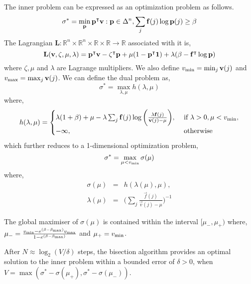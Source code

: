 The inner problem can be expressed as an optimization problem as follows.
\begin{equation}
\sigma^* = \min_{\mathbf{p}} \mathbf{\mathbf{p}}^\intercal\mathbf{v}: \mathbf{p} \in \Delta^n, \sum_{j} \mathbf{f}(j)\log{\ensuremath{\mathbf{p}}(j)} \geq \beta
\end{equation}
The Lagrangian $\mathbf{L}: \mathbb{R}^n \times \mathbb{R}^n \times \mathbb{R} \times \mathbb{R} \rightarrow \mathbb{R}$ associated with it is,
\begin{equation}
\mathbf{L}(\mathbf{v}, \zeta, \mu, \lambda) = \mathbf{\mathbf{p}}^\intercal\mathbf{v} - \mathbf{\zeta}^\intercal\mathbf{p} + \mu(1 - \mathbf{\mathbf{p}}^\intercal\mathbf{1}) + \lambda(\beta - \mathbf{f}^\intercal\log{\ensuremath{\mathbf{p}}})
\end{equation}
where $\zeta, \mu$ and $\lambda$ are Lagrange multipliers. We also define $v_{\textrm{min}} = \min_j{\mathbf{v}(j)}$ and $v_{\textrm{max}} = \max_j{\mathbf{v}(j)}$. We can define the dual problem as,
\begin{equation}
\sigma^* = \max_{\lambda, \mu} h(\lambda, \mu)
\end{equation}
where,
\begin{eqnarray}
h(\lambda, \mu) = 
	\begin{cases}
	\lambda(1 + \beta) + \mu - \lambda \sum_j \mathbf{f}(j) \log\bigg({\frac{\lambda \mathbf{f}(j)}{\mathbf{v}(j) - \mu}}\bigg), &\textrm{  if } \lambda > 0, \mu < v_{\textrm{min}}, \\
	-\infty, &\textrm{  otherwise } \\
	\end{cases} 
\end{eqnarray}
which further reduces to a 1-dimensional optimization problem,
\begin{equation}
\sigma^* = \max_{\mu < v_{\textrm{min}}} \sigma(\mu)
\end{equation}
where,
\begin{eqnarray}
\sigma(\mu) &=& h(\lambda(\mu), \mu), \\
\lambda(\mu) &=& \bigg(\sum_{j} \frac{\vec{f}(j)}{\vec{v}(j) - \mu}\bigg)^{-1}
\end{eqnarray}
\begin{lemma}
The global maximiser of $\sigma(\mu)$ is contained within the interval $[\mu_{-}, \mu_{+})$ where, $\mu_{-} = \frac{v_{\textrm{min}} - e^{(\beta - \beta_{\textrm{max}})}v_{\textrm{max}}}{1 - e^{(\beta - \beta_{\textrm{max}})}}$ and $\mu_{+} = v_{\textrm{min}}$.
\end{lemma}
\begin{lemma}
After $N \approx \log_2(V/ \delta)$ steps, the bisection algorithm provides an optimal solution to the inner problem within a bounded error of $\delta > 0$, when
$V = \max(\sigma^* - \sigma(\mu_+), \sigma^* - \sigma(\mu_-))$.
\end{lemma}
